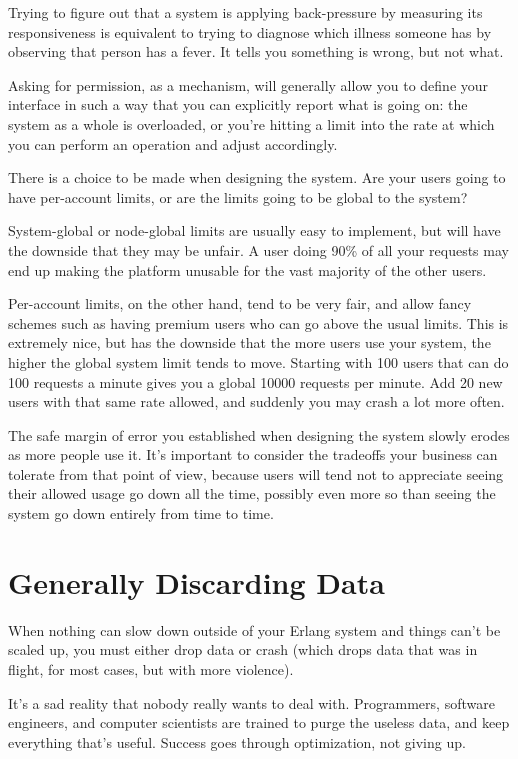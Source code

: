 \documentclass[11pt, oneside]{book}   	%
\begin{document}
Trying to figure out that a system is applying back-pressure by measuring its responsiveness is equivalent to trying to diagnose which illness someone has by observing that person has a fever. It tells you something is wrong, but not what.

Asking for permission, as a mechanism, will generally allow you to define your interface in such a way that you can explicitly report what is going on: the system as a whole is overloaded, or you're hitting a limit into the rate at which you can perform an operation and adjust accordingly.

There is a choice to be made when designing the system. Are your users going to have per-account limits, or are the limits going to be global to the system?

System-global or node-global limits are usually easy to implement, but will have the downside that they may be unfair. A user doing 90\% of all your requests may end up making the platform unusable for the vast majority of the other users.

Per-account limits, on the other hand, tend to be very fair, and allow fancy schemes such as having premium users who can go above the usual limits. This is extremely nice, but has the downside that the more users use your system, the higher the global system limit tends to move. Starting with 100 users that can do 100 requests a minute gives you a global 10000 requests per minute. Add 20 new users with that same rate allowed, and suddenly you may crash a lot more often.

The safe margin of error you established when designing the system slowly erodes as more people use it. It's important to consider the tradeoffs your business can tolerate from that point of view, because users will tend not to appreciate seeing their allowed usage go down all the time, possibly even more so than seeing the system go down entirely from time to time.


\section{Generally Discarding Data}

When nothing can slow down outside of your Erlang system and things can't be scaled up, you must either drop data or crash (which drops data that was in flight, for most cases, but with more violence).

It's a sad reality that nobody really wants to deal with. Programmers, software engineers, and computer scientists are trained to purge the useless data, and keep everything that's useful. Success goes through optimization, not giving up.
\end{document}
